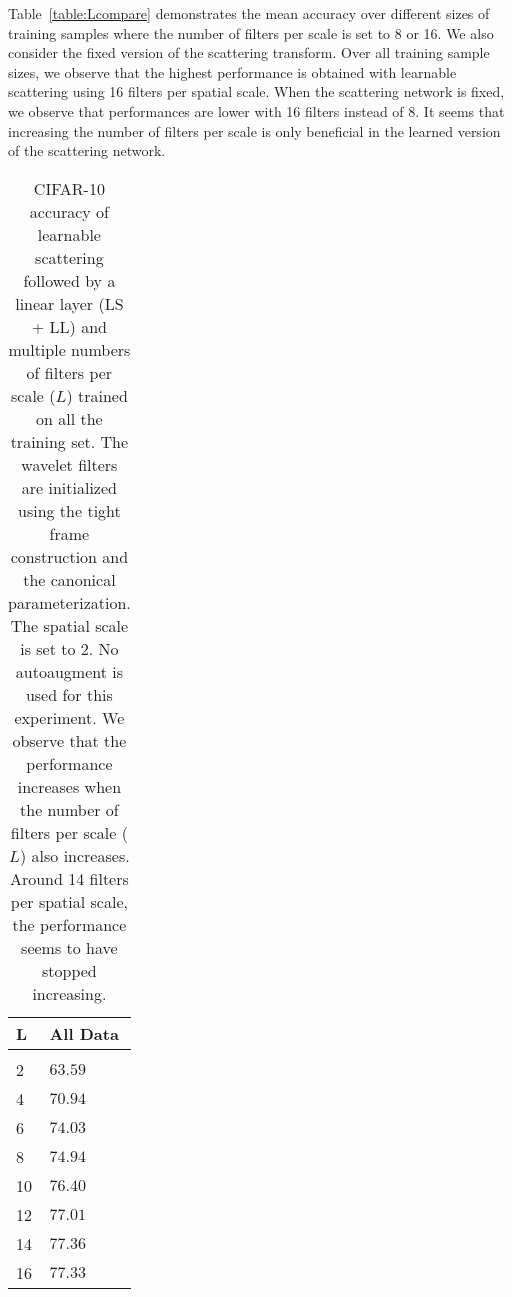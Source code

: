 \documentclass[10pt,twocolumn,letterpaper]{article}
\begin{document}
Table~\ref{table:Lcompare} demonstrates the mean accuracy over different sizes of training samples where the number of filters per scale is set to 8 or 16. We also consider the fixed version of the scattering transform. Over all training sample sizes, we observe that the highest performance is obtained with learnable scattering using 16 filters per spatial scale. When the scattering network is fixed, we observe that performances are lower with 16 filters instead of 8. It seems that increasing the number of filters per scale is only beneficial in the learned version of the scattering network. 


\begin{table}[H] 
    \centering
    \caption{CIFAR-10 accuracy of learnable scattering followed by a linear layer (LS + LL) and multiple numbers of filters per scale ($L$) trained on all the training set. The wavelet filters are initialized using the tight frame construction and the canonical parameterization. The spatial scale is set to 2. No autoaugment is used for this experiment. We observe that the performance increases when the number of filters per scale ($L$) also increases. Around 14 filters per spatial scale, the performance seems to have stopped increasing. } 
    \label{table:L}
    \fontsize{9}{9}\selectfont 
    \begin{tabularx}{0.15\linewidth}{ll} 
          \hline
         L & All Data\\
        \hline
        \\[-2mm]
        2& $63.59$\\
        4& $70.94$\\
        6& $74.03$\\
        8& $74.94$\\
        10& $76.40$\\
        12& $77.01$\\
        14& $\mathbf{77.36}$\\
        16& $77.33$\\
        \hline
    \end{tabularx}
\end{table} 
\end{document}
